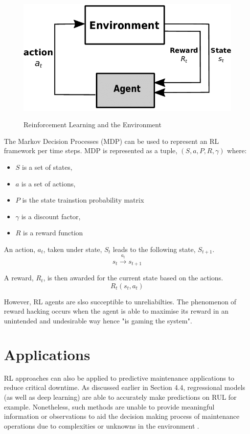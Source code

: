 \documentclass[a4paper,12pt]{report}
\begin{document}
\begin{figure}[H]
    \centering
    \caption{Reinforcement Learning and the Environment \cite{amiri_mehrpouyan_fridman_mallik_nallanathan_matolak_2018}}
    \includegraphics[scale=0.5]{RL.png}
    \label{fig:RL}
\end{figure}

The Markov Decision Processes (MDP) can be used to represent an RL framework per time steps.
MDP is represented as a tuple, $(S, a, P, R, \gamma)$ where:
\begin{itemize}
    \item $S$ is a set of states,
    \item $a$ is a set of actions,
    \item $P$ is the state trainstion probability matrix
    \item $\gamma$ is a discount factor, 
    \item $R$ is a reward function 
\end{itemize}   

An action, $a_t$, taken under state, $S_t$ leads to the following state, $S_{t+1}$. 
\begin{equation}
    s_t \xrightarrow{a_t} s_{t+1}
\end{equation}

A reward, $R_t$, is then awarded for the current state based on the actions.
\begin{equation}
    R_t(s_t, a_t) 
\end{equation}

However, RL agents are slso succeptible to unreliabilties. The phenomenon of reward hacking occurs when the agent is able to maximise its reward in an unintended and undesirable way hence "is gaming the system".

\section{Applications}
RL approaches can also be applied to predictive maintenance applications to reduce critical downtime. 
As discussed earlier in Section 4.4, regressional models (as well as deep learning) are able to accurately make predictions on RUL for example. 
Nonetheless, such methods are unable to provide meaningful information or observations to aid the decision making process of maintenance operations due to complexities or unknowns in the environment \cite{9221098}.
\end{document}
